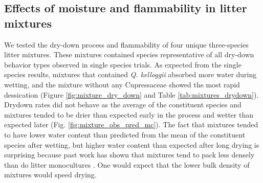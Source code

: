 \documentclass[fire,article,submit,moreauthors,pdftex]{Definitions/mdpi}
\begin{document}




\subsection{Effects of moisture and flammability in litter mixtures}

We tested the dry-down process and flammability of four unique three-species litter mixtures. These mixtures contained species representative of all dry-down behavior types observed in single species trials. As expected from the single species results, mixtures that contained \emph{Q. kelloggii} absorbed more water during wetting, and the mixture without any Cupressaceae showed the most rapid dessication (Figure \ref{fig:mixture_dry_down} and Table \ref{tab:mixtures_drydown}). Drydown rates did not behave as the average of the constituent species and mixtures tended to be drier than expected early in the process and wetter than expected later (Fig. \ref{fig:mixture_obs_pred_mc}). The fact that mixtures tended to have lower water content than predicted from the mean of the constituent species after wetting, but higher water content
than expected after long drying is surprising because past work has shown that
mixtures tend to pack less densely than do litter monocultures \cite[][, Table 2]{Magalhaes+Schwilk-2012}. One would expect that the lower bulk density of mixtures would speed drying. 
\end{document}
